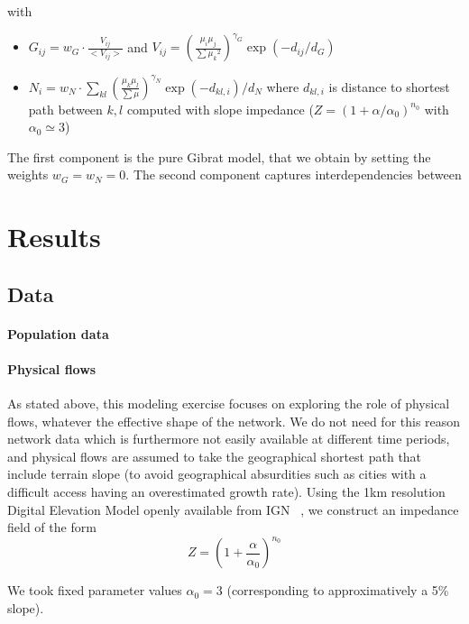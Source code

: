 with 
\begin{itemize}
\item $G_{ij} = w_G\cdot \frac{V_{ij}}{<V_{ij}>}$ and $V_{ij} = \left(\frac{\mu_i\mu_j}{\sum{\mu_k}^2}\right)^{\gamma_G} \exp{(-d_{ij}/d_G)}$
\item $N_{i} = w_N \cdot \sum_{kl} \left(\frac{\mu_k\mu_l}{\sum\mu}\right)^{\gamma_N}\exp{(-d_{kl,i})/d_N}$ where $d_{kl,i}$ is distance to shortest path between $k,l$ computed with slope impedance ($Z=\left(1+\alpha/\alpha_0\right)^{n_0}$ with $\alpha_0\simeq 3$)
\end{itemize}

The first component is the pure Gibrat model, that we obtain by setting the weights $w_G = w_N = 0$. The second component captures interdependencies between 



\section{Results}

\subsection{Data}


\paragraph{Population data}


\paragraph{Physical flows}

As stated above, this modeling exercise focuses on exploring the role of physical flows, whatever the effective shape of the network. We do not need for this reason network data which is furthermore not easily available at different time periods, and physical flows are assumed to take the geographical shortest path that include terrain slope (to avoid geographical absurdities such as cities with a difficult access having an overestimated growth rate). Using the 1km resolution Digital Elevation Model openly available from IGN~\cite{}%
, we construct an impedance field of the form
\[
Z = \left(1 + \frac{\alpha}{\alpha_0}\right)^{n_0}
\]

We took fixed parameter values $\alpha_0 = 3$ (corresponding to approximatively a 5\% slope).


